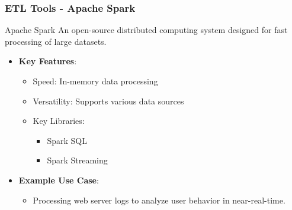 \documentclass[aspectratio=169]{beamer}
\begin{document}
\begin{frame}[fragile]
    \frametitle{ETL Tools - Apache Spark}
    \begin{block}{Apache Spark}
        An open-source distributed computing system designed for fast processing of large datasets.
    \end{block}
    
    \begin{itemize}
        \item \textbf{Key Features}:
            \begin{itemize}
                \item Speed: In-memory data processing
                \item Versatility: Supports various data sources
                \item Key Libraries:
                    \begin{itemize}
                        \item Spark SQL
                        \item Spark Streaming
                    \end{itemize}
            \end{itemize}
        \item \textbf{Example Use Case}: 
            \begin{itemize}
                \item Processing web server logs to analyze user behavior in near-real-time.
            \end{itemize}
    \end{itemize}
\end{frame}
\end{document}
